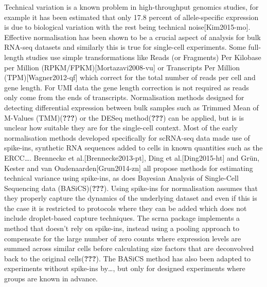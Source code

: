 \documentclass[11pt,a4paper,titlepage,twoside,openright]{style/unimelbthesis}
\theoremstyle{definition}
\theoremstyle{definition}
\theoremstyle{definition}
\theoremstyle{remark}
\begin{document}
\begin{mainmatter}
Technical variation is a known problem in high-throughput genomics studies, for example it has been estimated that only 17.8 percent of allele-specific expression is due to biological variation with the rest being technical noise{[}Kim2015-mo{]}. Effective normalisation has been shown to be a crucial aspect of analysis for bulk RNA-seq datasets and similarly this is true for single-cell experiments. Some full-length studies use simple transformations like Reads (or Fragments) Per Kilobase per Million (RPKM/FPKM){[}Mortazavi2008-vu{]} or Transcripts Per Million (TPM){[}Wagner2012-qf{]} which correct for the total number of reads per cell and gene length. For UMI data the gene length correction is not required as reads only come from the ends of transcripts. Normalisation methods designed for detecting differential expression between bulk samples such as Trimmed Mean of M-Values (TMM)({\textbf{???}}) or the DESeq method({\textbf{???}}) can be applied, but is is unclear how suitable they are for the single-cell context. Most of the early normalisation methods developed specifically for scRNA-seq data made use of spike-ins, synthetic RNA sequences added to cells in known quantities such as the ERCC\ldots{}. Brennecke et al.{[}Brennecke2013-pt{]}, Ding et al.{[}Ding2015-ht{]} and Grün, Kester and van Oudenaarden{[}Grun2014-zn{]} all propose methods for estimating technical variance using spike-ins, as does Bayesian Analysis of Single-Cell Sequencing data (BASiCS)({\textbf{???}}). Using spike-ins for normalisation assumes that they properly capture the dynamics of the underlying dataset and even if this is the case it is restricted to protocols where they can be added which does not include droplet-based capture techniques. The scrna package implements a method that doesn't rely on spike-ins, instead using a pooling approach to compensate for the large number of zero counts where expression levels are summed across similar cells before calculating size factors that are deconvolved back to the original cells({\textbf{???}}). The BASiCS method has also been adapted to experiments without spike-ins by\ldots{}, but only for designed experiments where groups are known in advance.


\end{mainmatter}
\end{document}
